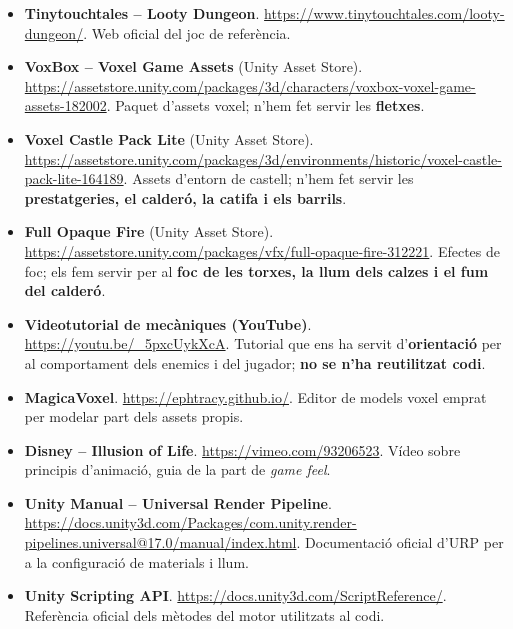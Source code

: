 \documentclass[11pt,a4paper]{article}
\begin{document}
\begin{itemize}
    \item \textbf{Tinytouchtales -- Looty Dungeon}.
    \url{https://www.tinytouchtales.com/looty-dungeon/}.
    Web oficial del joc de referència.

    \item \textbf{VoxBox -- Voxel Game Assets} (Unity Asset Store).
    \url{https://assetstore.unity.com/packages/3d/characters/voxbox-voxel-game-assets-182002}.
    Paquet d'assets voxel; n'hem fet servir les \textbf{fletxes}.

    \item \textbf{Voxel Castle Pack Lite} (Unity Asset Store).
    \url{https://assetstore.unity.com/packages/3d/environments/historic/voxel-castle-pack-lite-164189}.
    Assets d'entorn de castell; n'hem fet servir les \textbf{prestatgeries, el
    calderó, la catifa i els barrils}.

    \item \textbf{Full Opaque Fire} (Unity Asset Store).
    \url{https://assetstore.unity.com/packages/vfx/full-opaque-fire-312221}.
    Efectes de foc; els fem servir per al \textbf{foc de les torxes, la llum dels
    calzes i el fum del calderó}.

    \item \textbf{Videotutorial de mecàniques (YouTube)}.
    \url{https://youtu.be/_5pxcUykXcA}.
    Tutorial que ens ha servit d'\textbf{orientació} per al comportament dels
    enemics i del jugador; \textbf{no se n'ha reutilitzat codi}.

    \item \textbf{MagicaVoxel}.
    \url{https://ephtracy.github.io/}.
    Editor de models voxel emprat per modelar part dels assets propis.

    \item \textbf{Disney -- Illusion of Life}.
    \url{https://vimeo.com/93206523}.
    Vídeo sobre principis d'animació, guia de la part de \textit{game feel}.

    \item \textbf{Unity Manual -- Universal Render Pipeline}.
    \url{https://docs.unity3d.com/Packages/com.unity.render-pipelines.universal@17.0/manual/index.html}.
    Documentació oficial d'URP per a la configuració de materials i llum.

    \item \textbf{Unity Scripting API}.
    \url{https://docs.unity3d.com/ScriptReference/}.
    Referència oficial dels mètodes del motor utilitzats al codi.
\end{itemize}
\end{document}
